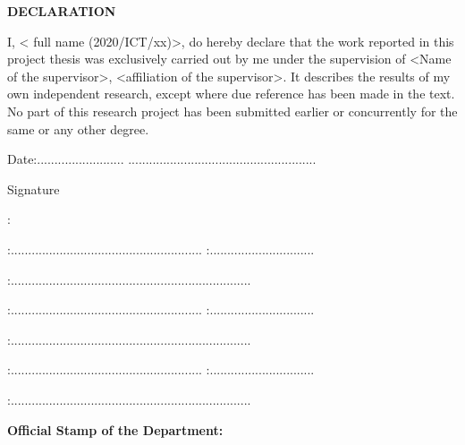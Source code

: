 \begin{center}
    \large{\textbf{DECLARATION}}
\end{center}%
\vspace{0.3in}
\noindent
I, < full name (2020/ICT/xx)>, do hereby declare that the work reported in this project thesis was exclusively carried out by me under the supervision of <Name of the supervisor>, <affiliation of the supervisor>. It describes the results of my own independent research, except where due reference has been made in the text. No part of this research project has been
submitted earlier or concurrently for the same or any other degree.

\vspace{0.5in}
\noindent Date:.........................\hspace{2in} ......................................................
\begin{flushright}Signature$\;\;\;\;\;\;\;\;\;\;\;\;\;\;\;\;\;\;\;\;\;\;\;\;\;\;\;$\end{flushright}
\vspace{0.8in}
\noindent {}:
\vspace{0.2in}

\noindent {}:.......................................................\hspace{0.5in} :..............................
\vspace{0.3in}

:.....................................................................

\vspace{0.3in}
\noindent {}:.......................................................\hspace{0.3in} :..............................
\vspace{0.3in}

:.....................................................................

\vspace{0.3in}
\noindent {}:.......................................................\hspace{0.3in} :..............................
\vspace{0.3in}

:.....................................................................

\vspace{0.5in}
\noindent\textbf{\large Official Stamp of the Department:}